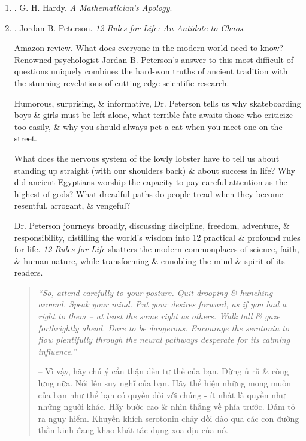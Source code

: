 \documentclass{article}
\begin{document}
\begin{enumerate}
	\item \cite{Hardy1940,Hardy1992,Hardy2022}. {\sc G. H. Hardy}. {\it A Mathematician's Apology}.\hfill{\sf[done]}
	
	\item \cite{Peterson_rule}. {\sc Jordan B. Peterson}. {\it12 Rules for Life: An Antidote to Chaos}.{}\hfill{\sf[reading]}
	
	{\sf Amazon review.} What does everyone in the modern world need to know? Renowned psychologist {\sc Jordan B. Peterson}'s answer to this most difficult of questions uniquely combines the hard-won truths of ancient tradition with the stunning revelations of cutting-edge scientific research.
	
	Humorous, surprising, \& informative, Dr. {\sc Peterson} tells us why skateboarding boys \& girls must be left alone, what terrible fate awaits those who criticize too easily, \& why you should always pet a cat when you meet one on the street.
	
	What does the nervous system of the lowly lobster have to tell us about standing up straight (with our shoulders back) \& about success in life? Why did ancient Egyptians worship the capacity to pay careful attention as the highest of gods? What dreadful paths do people tread when they become resentful, arrogant, \& vengeful?
	
	Dr. {\sc Peterson} journeys broadly, discussing discipline, freedom, adventure, \& responsibility, distilling the world's wisdom into 12 practical \& profound rules for life. {\it12 Rules for Life} shatters the modern commonplaces of science, faith, \& human nature, while transforming \& ennobling the mind \& spirit of its readers.
	
	\begin{quotation}
		{\it``So, attend carefully to your posture. Quit drooping \& hunching around. Speak your mind. Put your desires forward, as if you had a right to them -- at least the same right as others. Walk tall \& gaze forthrightly ahead. Dare to be dangerous. Encourage the serotonin to flow plentifully through the neural pathways desperate for its calming influence.''}
		
		-- Vì vậy, hãy chú ý cẩn thận đến tư thế của bạn. Đừng ủ rũ \& còng lưng nữa. Nói lên suy nghĩ của bạn. Hãy thể hiện những mong muốn của bạn như thể bạn có quyền đối với chúng - ít nhất là quyền như những người khác. Hãy bước cao \& nhìn thẳng về phía trước. Dám tỏ ra nguy hiểm. Khuyến khích serotonin chảy dồi dào qua các con đường thần kinh đang khao khát tác dụng xoa dịu của nó.
		

\end{quotation}
\end{enumerate}
\end{document}
